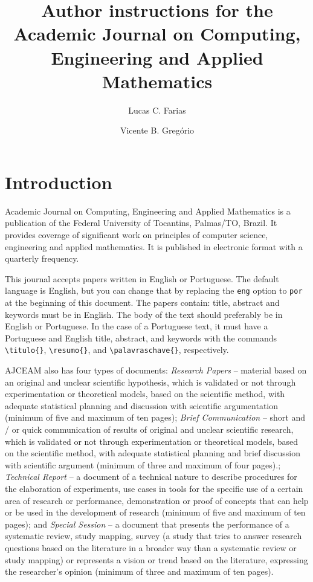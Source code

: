\documentclass[eng]{ajceam-class}
\title{Author instructions for the Academic Journal on Computing, Engineering and Applied Mathematics}
\author[1]{Lucas C. Farias}
\author[2]{Vicente B. Gregório}
\affil[1]{University Name, Department Name or Institute, State, Country}
\affil[2]{(Other) University Name, Department Name or Institute, State, Country}
\affil[3]{(Other) University Name, Department Name or Institute, State, Country}
\begin{document}
\maketitle
\thispagestyle{fancy}
\printcontactdata

\section{Introduction}
Academic Journal on Computing, Engineering and Applied Mathematics is a publication of the Federal University of Tocantins, Palmas/TO, Brazil. It provides coverage of significant work on principles  of computer science, engineering and applied mathematics. It is published in electronic format with a quarterly frequency.

This journal accepts papers written in English or Portuguese. The default language is English, but you can change that by replacing the \texttt{eng} option to \texttt{por} at the beginning of this document. The papers contain: title, abstract and keywords must be in English. The body of the text should preferably be in English or Portuguese. In the case of a Portuguese text, it must have a Portuguese and English title, abstract, and keywords with the commands \verb|\titulo{}|, \verb|\resumo{}|, and \verb|\palavraschave{}|, respectively.

AJCEAM also has four types of documents: \textit{Research Papers} -- material based on an original and unclear scientific hypothesis, which is validated or not through experimentation or theoretical models, based on the scientific method, with adequate statistical planning and discussion with scientific argumentation (minimum of five and maximum of ten pages); \textit{Brief Communication} -- short and / or quick communication of results of original and unclear scientific research, which is validated or not through experimentation or theoretical models, based on the scientific method, with adequate statistical planning and brief discussion with scientific argument (minimum of three and maximum of four pages).; \textit{Technical Report} -- a document of a technical nature to describe procedures for the elaboration of experiments, use cases in tools for the specific use of a certain area of research or performance, demonstration or proof of concepts that can help or be used in the development of research (minimum of five and maximum of ten pages); and \textit{Special Session} -- a document that presents the performance of a systematic review, study mapping, survey (a study that tries to answer research questions based on the literature in a broader way than a systematic review or study mapping) or represents a vision or trend based on the literature, expressing the researcher's opinion (minimum of three and maximum of ten pages).
\end{document}
